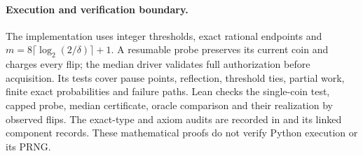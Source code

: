\paragraph{Execution and verification boundary.}
The implementation uses integer thresholds, exact rational endpoints and
$m=8\lceil\log_2(2/\delta)\rceil+1$. A resumable probe preserves its current
coin and charges every flip; the median driver validates full authorization
before acquisition. Its tests cover pause points, reflection, threshold ties,
partial work, finite exact probabilities and failure paths. Lean checks
the single-coin test, capped probe, median certificate, oracle comparison
and their realization by observed flips. The exact-type and axiom audits
are recorded in 
and its linked component records. These mathematical proofs do not verify
Python execution or its PRNG.
